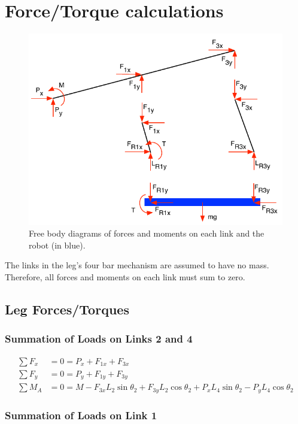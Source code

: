 \documentclass[letterpaper]{article}
\begin{document}
\section{Force/Torque calculations}

\begin{figure}[htb]
	\centering
	\includegraphics{FB.pdf}
	\caption{Free body diagrams of forces and moments on each link and the robot (in blue).}
	\label{fig:FB}
\end{figure}

The links in the leg's four bar mechanism are assumed to have no mass. Therefore, all forces and moments on each link must sum to zero.
\subsection{Leg Forces/Torques}
\subsubsection{Summation of Loads on Links 2 and 4}

\begin{align*}
	\sum F_x &= 0 = P_x + F_{1x} + F_{3x} \\
	\sum F_y &= 0 = P_y + F_{1y} + F_{3y} \\
	\sum M_A &= 0 = M - F_{3x} L_2 \sin \theta_2 + F_{3y} L_2 \cos \theta_2 + P_x L_4 \sin \theta_2 - P_y L_4 \cos \theta_2
\end{align*}

\subsubsection{Summation of Loads on Link 1}
\end{document}

